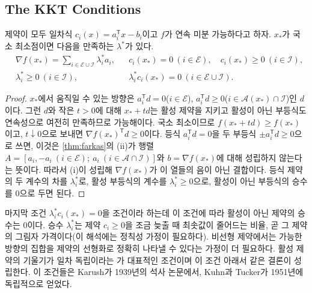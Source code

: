 \subsection{The KKT Conditions}

\begin{theorem}
\label{thm:kkt-linear}
제약이 모두 일차식 $c_i(x)=a_i^{\mathsf T}x-b_i$이고 $f$가 연속 미분 가능하다고 하자. $x_\ast$가 국소 최소점이면 다음을 만족하는 $\lambda^\ast$가 있다.
\begin{align*}
&\nabla f(x_\ast)=\sum_{i\in\mathcal E\cup\mathcal I}\lambda_i^\ast a_i,&&c_i(x_\ast)=0\ (i\in\mathcal E),\quad c_i(x_\ast)\ge0\ (i\in\mathcal I),\\
&\lambda_i^\ast\ge0\ (i\in\mathcal I),&&\lambda_i^\ast c_i(x_\ast)=0\ (i\in\mathcal E\cup\mathcal I).
\end{align*}
\end{theorem}

\begin{proof}
$x_\ast$에서 움직일 수 있는 방향은 $a_i^{\mathsf T}d=0$($i\in\mathcal E$), $a_i^{\mathsf T}d\ge0$($i\in\mathcal A(x_\ast)\cap\mathcal I$)인 $d$이다. 그런 $d$와 작은 $t>0$에 대해 $x_\ast+td$는 활성 제약을 지키고 활성이 아닌 부등식도 연속성으로 여전히 만족하므로 가능해이다. 국소 최소이므로 $f(x_\ast+td)\ge f(x_\ast)$이고, $t\downarrow0$으로 보내면 $\nabla f(x_\ast)^{\mathsf T}d\ge0$이다. 등식 $a_i^{\mathsf T}d=0$을 두 부등식 $\pm a_i^{\mathsf T}d\ge0$으로 쓰면, 이것은 \cref{thm:farkas}의 (ii)가 행렬 $A=[a_i,-a_i\ (i\in\mathcal E);\ a_i\ (i\in\mathcal A\cap\mathcal I)]$와 $b=\nabla f(x_\ast)$에 대해 성립하지 않는다는 뜻이다. 따라서 (i)이 성립해 $\nabla f(x_\ast)$가 이 열들의 음이 아닌 결합이다. 등식 제약의 두 계수의 차를 $\lambda_i^\ast$로, 활성 부등식의 계수를 $\lambda_i^\ast\ge0$으로, 활성이 아닌 부등식의 승수를 $0$으로 두면 된다.
\end{proof}

마지막 조건 $\lambda_i^\ast c_i(x_\ast)=0$을  조건이라 하는데 이 조건에 따라 활성이 아닌 제약의 승수는 $0$이다. 승수 $\lambda_i^\ast$는 제약 $c_i\ge0$을 조금 늦출 때 최솟값이 줄어드는 비율, 곧 그 제약의 그림자 가격이다(이 해석에는 정칙성 가정이 필요하다). 비선형 제약에서는 가능한 방향의 집합을 제약의 선형화로 정확히 나타낼 수 있다는 가정이 더 필요하다. 활성 제약의 기울기가 일차 독립이라는 가 대표적인 조건이며 이 조건 아래서 같은 결론이 성립한다\cite{nocedal2006}. 이 조건들은 Karush가 1939년의 석사 논문에서\cite{karush1939}, Kuhn과 Tucker가 1951년에 독립적으로 얻었다\cite{kuhn1951}.

